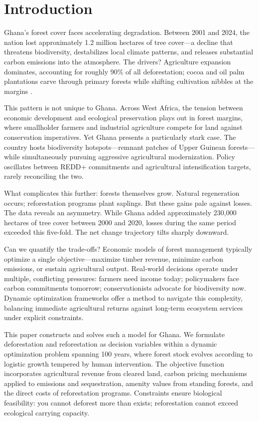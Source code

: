 \section{Introduction}

Ghana's forest cover faces accelerating degradation. Between 2001 and 2024, the nation lost approximately 1.2 million hectares of tree cover—a decline that threatens biodiversity, destabilizes local climate patterns, and releases substantial carbon emissions into the atmosphere. The drivers? Agriculture expansion dominates, accounting for roughly 90\% of all deforestation; cocoa and oil palm plantations carve through primary forests while shifting cultivation nibbles at the margins \citep{curtis2018classifying}.

This pattern is not unique to Ghana. Across West Africa, the tension between economic development and ecological preservation plays out in forest margins, where smallholder farmers and industrial agriculture compete for land against conservation imperatives. Yet Ghana presents a particularly stark case. The country hosts biodiversity hotspots—remnant patches of Upper Guinean forests—while simultaneously pursuing aggressive agricultural modernization. Policy oscillates between REDD+ commitments and agricultural intensification targets, rarely reconciling the two.

What complicates this further: forests themselves grow. Natural regeneration occurs; reforestation programs plant saplings. But these gains pale against losses. The data reveals an asymmetry. While Ghana added approximately 230,000 hectares of tree cover between 2000 and 2020, losses during the same period exceeded this five-fold. The net change trajectory tilts sharply downward.

Can we quantify the trade-offs? Economic models of forest management typically optimize a single objective—maximize timber revenue, minimize carbon emissions, or sustain agricultural output. Real-world decisions operate under multiple, conflicting pressures: farmers need income today; policymakers face carbon commitments tomorrow; conservationists advocate for biodiversity now. Dynamic optimization frameworks offer a method to navigate this complexity, balancing immediate agricultural returns against long-term ecosystem services under explicit constraints.

This paper constructs and solves such a model for Ghana. We formulate deforestation and reforestation as decision variables within a dynamic optimization problem spanning 100 years, where forest stock evolves according to logistic growth tempered by human intervention. The objective function incorporates agricultural revenue from cleared land, carbon pricing mechanisms applied to emissions and sequestration, amenity values from standing forests, and the direct costs of reforestation programs. Constraints ensure biological feasibility: you cannot deforest more than exists; reforestation cannot exceed ecological carrying capacity.

